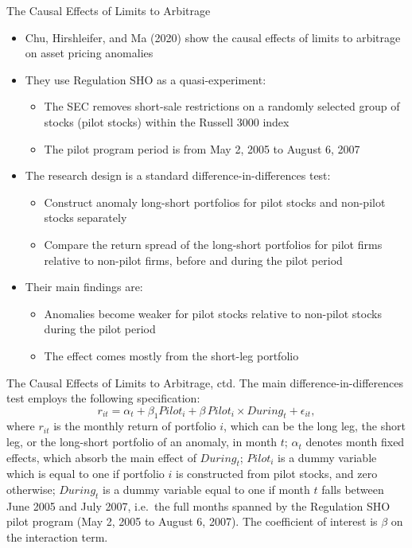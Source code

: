 \documentclass[aspectratio=169, 11pt]{beamer}
\begin{document}
\begin{frame}[shrink=10]{The Causal Effects of Limits to Arbitrage}
\begin{itemize}
\item Chu, Hirshleifer, and Ma (2020) show the causal effects of limits to arbitrage on asset pricing anomalies
\item They use Regulation SHO as a quasi-experiment:
  \begin{itemize}
  \item The SEC removes short-sale restrictions on a randomly selected group of stocks (pilot stocks) within the Russell 3000 index
  \item The pilot program period is from May 2, 2005 to August 6, 2007
  \end{itemize}
\item The research design is a standard difference-in-differences test:
  \begin{itemize}
  \item Construct anomaly long-short portfolios for pilot stocks and non-pilot stocks separately
  \item Compare the return spread of the long-short portfolios for pilot firms relative to non-pilot firms, before and during the pilot period
  \end{itemize}
\item Their main findings are:
  \begin{itemize}
  \item Anomalies become weaker for pilot stocks relative to non-pilot stocks during the pilot period
  \item The effect comes mostly from the short-leg portfolio
  \end{itemize}
\end{itemize}
\end{frame}


\begin{frame}[shrink=5]{The Causal Effects of Limits to Arbitrage, ctd.}
	The main difference-in-differences test employs the following specification:
	\begin{equation}
		r_{it} = \alpha_t + \beta_1 Pilot_i + \beta\, Pilot_i \times During_t + \epsilon_{it},
		\label{eq:did}
	\end{equation}
	where $r_{it}$ is the monthly return of portfolio $i$, which can be the long leg, the short leg, or the long-short portfolio of an anomaly, in month $t$; $\alpha_t$ denotes month fixed effects, which absorb the main effect of $During_t$; $Pilot_i$ is a dummy variable which is equal to one if portfolio $i$ is constructed from pilot stocks, and zero otherwise; $During_t$ is a dummy variable equal to one if month $t$ falls between June 2005 and July 2007, i.e.\ the full months spanned by the Regulation SHO pilot program (May 2, 2005 to August 6, 2007). The coefficient of interest is $\beta$ on the interaction term.
\end{frame}
\end{document}
